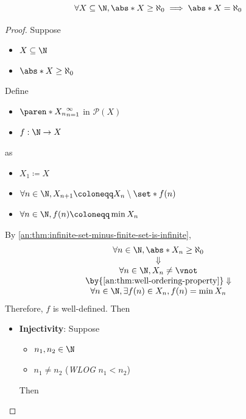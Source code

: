 \bigskip

\begin{lemma} \label{an:lem:infinite-subset-of-N-is-countable}
  \[
    \forall X \subseteq \N, \abs*{X} \geq \aleph_{0} \implies \abs*{X} = \aleph_{0}
  \]
\end{lemma}

\begin{proof}
  Suppose
  \begin{itemize}
    \item $X \subseteq \N$
    \item $\abs*{X} \geq \aleph_{0}$
  \end{itemize}
  Define
  \begin{itemize}
    \item $\paren*{X_{n}}_{n = 1}^{\infty}$ in $\mathcal{P}(X)$
    \item $f: \N \to X$
  \end{itemize}
  as
  \begin{itemize}
    \item $X_{1} \coloneqq X$
    \item $\forall n \in \N, X_{n + 1} \coloneqq X_{n} \setminus \set*{f(n)}$
    \item $\forall n \in \N, f(n) \coloneqq \min X_{n}$
  \end{itemize}
  By \cref{an:thm:infinite-set-minus-finite-set-is-infinite},
  \[
    \begin{array}{c}
      \forall n \in \N, \abs*{X_{n}} \geq \aleph_{0}              \\
      \Downarrow                                                  \\
      \forall n \in \N, X_{n} \neq \vnot                          \\
      \by{\Cref{an:thm:well-ordering-property}} \Downarrow        \\
      \forall n \in \N, \exists f(n) \in X_{n}, f(n) = \min X_{n} \\
    \end{array}
  \]
  Therefore, $f$ is well-defined. Then
  \begin{itemize}
    \item \textbf{Injectivity}: Suppose
          \begin{itemize}
            \item $n_{1}, n_{2} \in \N$
            \item $n_{1} \neq n_{2}$ (\emph{WLOG} $n_{1} < n_{2}$)
          \end{itemize}
          Then
          \[
\]
\end{itemize}
\end{proof}
